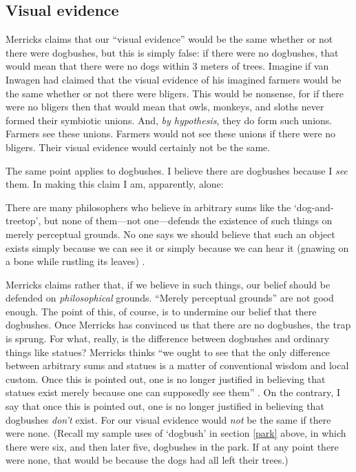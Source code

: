 \documentclass[11pt]{article}
\newenvironment{squote}{%
\begin{spacing}{1}
       	\begin{list}{}{%
\setlength{\labelwidth}{0pt}%
\rightmargin\leftmargin%
}
\item\relax
}{%
\end{list}%
\end{spacing}
}
\begin{document}
\begin{spacing}{1.25}
\subsection{Visual evidence}
\label{visual}
Merricks claims that our ``visual evidence'' would be the same whether
or not there were dogbushes, but this is simply false: if there were
no dogbushes, that would mean that there were no dogs within 3 meters
of trees.  Imagine if van Inwagen had claimed that the visual evidence
of his imagined farmers would be the same whether or not there were
bligers.  This would be nonsense, for if there were no bligers then
that would mean that owls, monkeys, and sloths never formed their
symbiotic unions.  And, {\em by hypothesis}, they do form such
unions.  Farmers see these unions.  Farmers would not see these unions
if there were no bligers.  Their visual evidence would certainly not
be the same.

The same point applies to dogbushes.  I believe there are dogbushes
because I {\em see} them.  In making this claim I am, apparently,
alone:

\begin{squote}
There are many philosophers who believe in arbitrary sums like the
`dog-and-treetop', but none of them---not one---defends the existence
of such things on merely perceptual grounds. No one says we should
believe that such an object exists simply because we can see it or
simply because we can hear it (gnawing on a bone while rustling its
leaves) \citep[74]{merricks2001a}.
\end{squote}

Merricks claims rather that, if we believe in such things, our belief
should be defended on {\em philosophical} grounds.  ``Merely
perceptual grounds'' are not good enough.  The point of this, of
course, is to undermine our belief that there dogbushes.  Once
Merricks has convinced us that there are no dogbushes, the trap is
sprung.  For what, really, is the difference between dogbushes and
ordinary things like statues?  Merricks thinks ``we ought to see that
the only difference between arbitrary sums and statues is a matter of
conventional wisdom and local custom.  Once this is pointed out, one
is no longer justified in believing that statues exist merely because
one can supposedly see them'' \citeyearpar[75]{merricks2001a}.  On the
contrary, I say that once this is pointed out, one is no longer
justified in believing that dogbushes {\em don't} exist.  For our
visual evidence would {\em not} be the same if there were none.
(Recall my sample uses of `dogbush' in section \ref{park} above, in
which there were six, and then later five, dogbushes in the park.  If
at any point there were none, that would be because the dogs had all
left their trees.)


\end{spacing}
\end{document}
